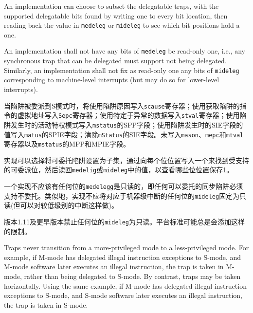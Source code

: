 An
implementation can choose to subset the delegatable traps, with the
supported delegatable bits found by writing one to every bit location,
then reading back the value in {\tt medeleg} or {\tt mideleg} to see
which bit positions hold a one.

An implementation shall not have any bits of {\tt medeleg} be read-only one, i.e.,
any synchronous trap that can be delegated must support not being delegated.
Similarly, an implementation shall not fix as read-only one any bits of
{\tt mideleg} corresponding to machine-level interrupts (but may do so
for lower-level interrupts).
\fi

当陷阱被委派到S模式时，将使用陷阱原因写入{\tt scause}寄存器；使用获取陷阱的指令的虚拟地址写入{\tt Sepc}寄存器；使用特定于异常的数据写入{\tt stval}寄存器；使用陷阱发生时的活动特权模式写入{\tt mstatus}的SPP字段；使用陷阱发生时的SIE字段的值写入{\tt matus}的SPIE字段；清除{\tt mStatus}的SIE字段。未写入{\tt mason}、{\tt mepc}和{\tt mtval}寄存器以及{\tt mstatus}的MPP和MPIE字段。

实现可以选择将可委托陷阱设置为子集，通过向每个位位置写入一个来找到受支持的可委派位，然后读回{\tt medelig}或{\tt mideleg}中的值，以查看哪些位位置保存1。

一个实现不应该有任何位的{\tt medelegg}是只读的，即任何可以委托的同步陷阱必须支持不委托。类似地，实现不应将对应于机器级中断的任何位的{\tt mideleg}固定为只读(但可以对较低级别的中断这样做)。

\iffalse
\begin{commentary}
Version 1.11 and earlier prohibited having any bits of {\tt mideleg}
be read-only one.
Platform standards may always add such restrictions.
\end{commentary}
\fi

\begin{commentary}
版本1.11及更早版本禁止任何位的{\tt mideleg}为只读。平台标准可能总是会添加这样的限制。
\end{commentary}

\iffalse
Traps never transition from a more-privileged mode to a less-privileged mode.
For example, if M-mode has delegated illegal instruction exceptions to S-mode, and
M-mode software later executes an illegal instruction, the trap is taken in
M-mode, rather than being delegated to S-mode.  By contrast, traps may be
taken horizontally.  Using the same example, if M-mode has delegated illegal
instruction exceptions to S-mode, and S-mode software later executes an illegal
instruction, the trap is taken in S-mode.


